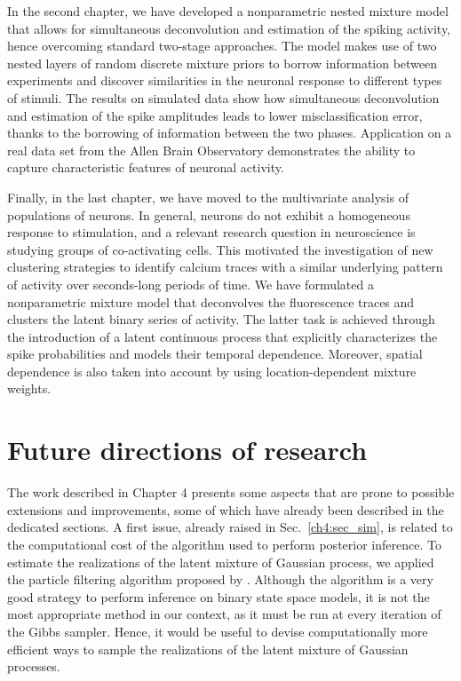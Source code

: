 In the second chapter, we have developed a nonparametric nested mixture model that allows for simultaneous deconvolution and estimation of the spiking activity, hence overcoming standard two-stage approaches.
The model makes use of two nested layers of random discrete mixture priors to borrow information between experiments and discover similarities in the neuronal response to different types of stimuli. 
The results on simulated data show how simultaneous deconvolution and estimation of the spike amplitudes leads to lower misclassification error, thanks to the borrowing of information between the two phases. Application on a real data set from the Allen Brain Observatory demonstrates the ability to capture characteristic features of neuronal activity.

Finally, in the last chapter, we have moved to the multivariate analysis of populations of neurons. In general, neurons do not exhibit a homogeneous response to stimulation, and a relevant research question in neuroscience is studying groups of co-activating cells.
This motivated the investigation of new clustering strategies to identify calcium traces with a similar underlying pattern of activity over seconds-long periods of time.
We have formulated a nonparametric mixture model that deconvolves the fluorescence traces and clusters the latent binary series of activity. The latter task is achieved through the introduction of a latent continuous process that explicitly characterizes the spike probabilities and models their temporal dependence. Moreover, spatial dependence is also taken into account by using location-dependent mixture weights.

\section*{Future directions of research}

The work described in Chapter 4 presents some aspects that are prone to possible extensions and improvements, some of which have already been described in the dedicated sections. A first issue, already raised in Sec.~\ref{ch4:sec_sim}, is related to the computational cost of the algorithm used to perform posterior inference. To estimate the realizations of the latent mixture of Gaussian process, we applied the particle filtering algorithm proposed by \textcite{fasano2021}. Although the algorithm is a very good strategy to perform inference on binary state space models, it is not the most appropriate method in our context, as it must be run at every iteration of the Gibbs sampler. Hence, it would be useful to devise computationally more efficient ways to sample the realizations of the latent mixture of Gaussian processes.

